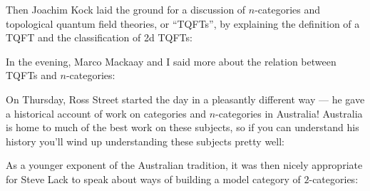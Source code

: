 \documentclass{article}
\def\tightlist{}
\renewcommand{\texttt}[1]{%
  \begingroup
  \ttfamily
  \begingroup\lccode`~=`/\lowercase{\endgroup\def~}{/\discretionary{}{}{}}%
  \begingroup\lccode`~=`[\lowercase{\endgroup\def~}{[\discretionary{}{}{}}%
  \begingroup\lccode`~=`.\lowercase{\endgroup\def~}{.\discretionary{}{}{}}%
  \catcode`/=\active\catcode`[=\active\catcode`.=\active
  \scantokens{#1\noexpand}%
  \endgroup
}
\begin{document}
Then Joachim Kock laid the ground for a discussion of \(n\)-categories
and topological quantum field theories, or ``TQFTs'', by explaining the
definition of a TQFT and the classification of 2d TQFTs:


In the evening, Marco Mackaay and I said more about the relation between
TQFTs and \(n\)-categories:


On Thursday, Ross Street started the day in a pleasantly different way
--- he gave a historical account of work on categories and
\(n\)-categories in Australia! Australia is home to much of the best
work on these subjects, so if you can understand his history you'll wind
up understanding these subjects pretty well:


As a younger exponent of the Australian tradition, it was then nicely
appropriate for Steve Lack to speak about ways of building a model
category of \(2\)-categories:

\end{document}
